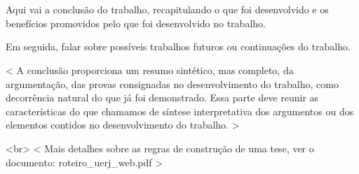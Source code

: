 \chapter*{}
\noindent
{}
\newline
\newline

Aqui vai a conclusão do trabalho, recapitulando o que foi desenvolvido e os benefícios promovidos pelo que foi desenvolvido no trabalho. 

Em seguida, falar sobre possíveis trabalhos futuros ou continuações do trabalho.

< A conclusão proporciona um resumo sintético, mas completo, da argumentação,
das provas consignadas no desenvolvimento do trabalho, como decorrência
natural do que já foi demonstrado. Essa parte deve reunir as características do que
chamamos de síntese interpretativa dos argumentos ou dos elementos contidos no
desenvolvimento do trabalho. >

<br>
< Mais detalhes sobre as regras de construção de uma tese, ver o documento:
roteiro\_uerj\_web.pdf >
